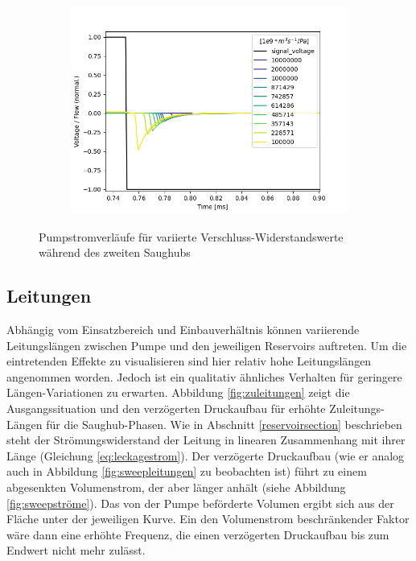 \documentclass[fontsize=12pt, a4paper]{scrartcl}
\begin{document}
\begin{figure}[H]
	\centering
	\begin{subfigure}[H]{0.48\textwidth}
		\includegraphics[width=\textwidth, valign=t]{bilder/leakage/leakage_in_branch_multiweep_flow.png}
	\end{subfigure}
    \caption{Pumpstromverläufe für variierte Verschluss-Widerstandswerte während des zweiten Saughubs}
    \label{fig:leckagestrom}
\end{figure}

\subsection{Leitungen}

Abhängig vom Einsatzbereich und Einbauverhältnis können variierende Leitungslängen zwischen Pumpe und den jeweiligen Reservoirs auftreten. Um die eintretenden Effekte zu visualisieren sind hier relativ hohe Leitungslängen angenommen worden. Jedoch ist ein qualitativ ähnliches Verhalten für geringere Längen-Variationen zu erwarten. Abbildung \ref{fig:zuleitungen} zeigt die Ausgangssituation und den verzögerten Druckaufbau für erhöhte Zuleitungs-Längen für die Saughub-Phasen. Wie in Abschnitt \ref{reservoirsection} beschrieben steht der Strömungswiderstand der Leitung in linearen Zusammenhang mit ihrer Länge (Gleichung \ref{eq:leckagestrom}). Der verzögerte Druckaufbau (wie er analog auch in Abbildung \ref{fig:sweepleitungen} zu beobachten ist) führt zu einem abgesenkten Volumenstrom, der aber länger anhält (siehe Abbildung \ref{fig:sweepströme}). Das von der Pumpe beförderte Volumen ergibt sich aus der Fläche unter der jeweiligen Kurve. Ein den Volumenstrom beschränkender Faktor wäre dann eine erhöhte Frequenz, die einen verzögerten Druckaufbau bis zum Endwert nicht mehr zulässt.
\end{document}
